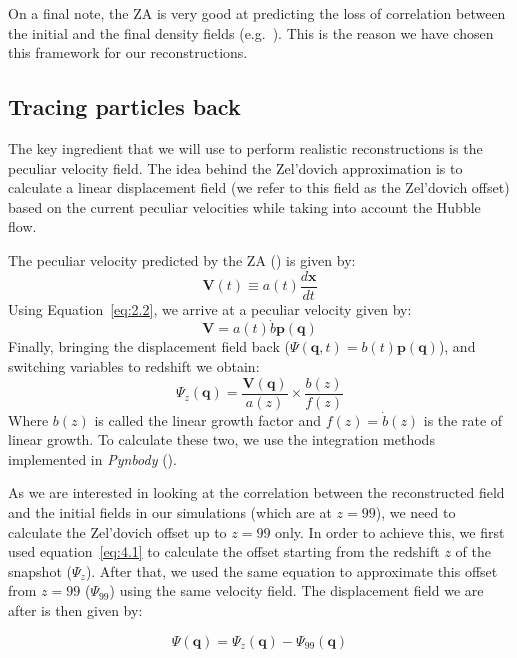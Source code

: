 On a final note, the ZA is very good at predicting the loss of correlation between the initial and the final density fields (e.g.~\cite{Pontzen_paired_simulations}). This is the reason we have chosen this framework for our reconstructions.


\subsection{Tracing particles back}

The key ingredient that we will use to perform realistic reconstructions is the peculiar velocity field. The idea behind the Zel'dovich approximation is to calculate a linear displacement field (we refer to this field as the Zel'dovich offset) based on the current peculiar velocities while taking into account the Hubble flow. 

The peculiar velocity predicted by the ZA (\cite{1993sfu..book.....P}) is given by:
\begin{equation}
    \textbf{V}(t) \equiv a(t)\frac{d\textbf{x}}{dt}    
\end{equation}
Using Equation~\ref{eq:2.2}, we arrive at a peculiar velocity given by:
\begin{equation}
    \textbf{V} = a(t)\dot{b}\textbf{p}(\textbf{q})
\end{equation}
Finally, bringing the displacement field back ($\Psi(\textbf{q},t) = b(t) \textbf{p}(\textbf{q})$), and switching variables to redshift we obtain:
\begin{equation}
    \Psi_z(\textbf{q}) = \frac{\textbf{V}(\textbf{q})}{a(z)} \times \frac{b(z)}{f(z)}
    \label{eq:4.1}
\end{equation} 
Where $b(z)$ is called the linear growth factor and $f(z) = \dot{b}(z)$ is the rate of linear growth. To calculate these two, we use the integration methods implemented in \textit{Pynbody} (\cite{2013ascl.soft05002P}).

As we are interested in looking at the correlation between the reconstructed field  and the initial fields in our simulations (which are at $z=99$), we need to calculate the Zel'dovich offset up to $z=99$ only. In order to achieve this, we first used equation~\ref{eq:4.1} to calculate the offset starting from the redshift $z$ of the snapshot ($\Psi_z$). After that, we used the same equation to approximate this offset from $z=99$ ($\Psi_{99}$) using the same velocity field. The displacement field we are after is then given by:

\begin{equation}
    \Psi(\textbf{q}) = \Psi_z(\textbf{q}) - \Psi_{99}(\textbf{q})
    \label{eq:4.2}
\end{equation}


